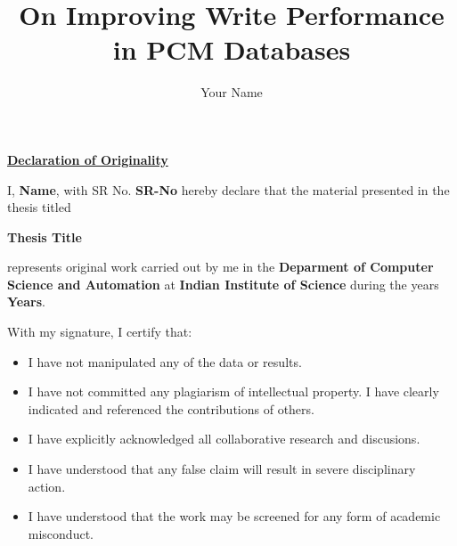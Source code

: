 \documentclass[oneside,12pt]{IIScthesisPSnPDF}
\begin{document}
\title{On Improving Write Performance in PCM Databases} 

\submitdate{\monthyeardate\today} 
\me
\author{Your Name}



\maketitle


\begin{center}
\LARGE{\underline{\textbf{Declaration of Originality}}}
\end{center}
\noindent I, \textbf{Name}, with SR No. \textbf{SR-No} hereby declare that
the material presented in the thesis titled

\begin{center}
\textbf{Thesis Title}
\end{center}

\noindent represents original work carried out by me in the \textbf{Deparment
of Computer Science and Automation} at \textbf{Indian Institute of
Science} during the years \textbf{Years}.

\noindent With my signature, I certify that:
\begin{itemize}
	\item I have not manipulated any of the data or results.
	\item I have not committed any plagiarism of intellectual
	property.
	I have clearly indicated and referenced the contributions of
	others.
	\item I have explicitly acknowledged all collaborative research
	and discusions.
	\item I have understood that any false claim will result in severe
	disciplinary action.
	\item I have understood that the work may be screened for any form
	of academic misconduct.
\end{itemize}

\vspace{20mm}

 \qquad

\vspace{20mm}
\end{document}

